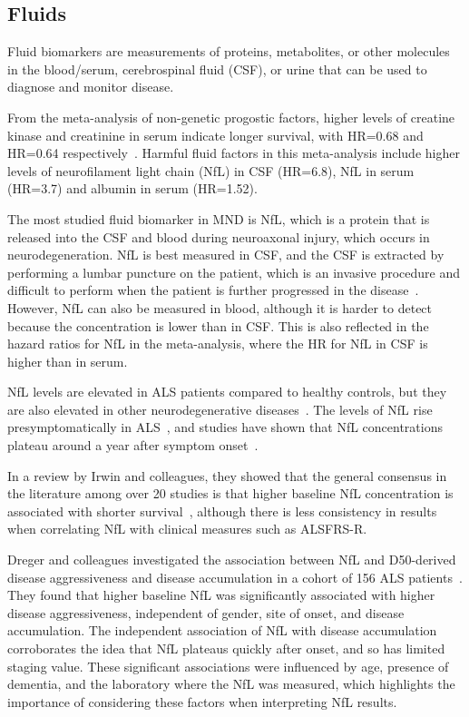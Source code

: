\subsection{Fluids}

Fluid biomarkers are measurements of proteins, metabolites, or other molecules in the blood/serum, cerebrospinal fluid (CSF), or urine that can be used to diagnose and monitor disease.

From the meta-analysis of non-genetic progostic factors, higher levels of creatine kinase and creatinine in serum indicate longer survival, with HR=0.68 and HR=0.64 respectively~\cite{suPredictorsSurvivalPatients2021}.
Harmful fluid factors in this meta-analysis  include higher levels of neurofilament light chain (NfL) in CSF (HR=6.8), NfL in serum (HR=3.7) and albumin in serum (HR=1.52).

The most studied fluid biomarker in MND is NfL, which is a protein that is released into the CSF and blood during neuroaxonal injury, which occurs in neurodegeneration.
NfL is best measured in CSF, and the CSF is extracted by performing a lumbar puncture on the patient, which is an invasive procedure and difficult to perform when the patient is further progressed in the disease~\cite{sturmeyBloodBiomarkersALS2022}.
However, NfL can also be measured in blood, although it is harder to detect because the concentration is lower than in CSF. This is also reflected in the hazard ratios for NfL in the meta-analysis, where the HR for NfL in CSF is higher than in serum.

NfL levels are elevated in ALS patients compared to healthy controls, but they are also elevated in other neurodegenerative diseases~\cite{huangLongitudinalBiomarkersAmyotrophic2020}.
The levels of NfL rise presymptomatically in ALS~\cite{benatarValidationSerumNeurofilaments2020}, and studies have shown that NfL concentrations plateau around a year after symptom onset~\cite{benatarNeurofilamentsPresymptomaticALS2019, benatarValidationSerumNeurofilaments2020, thompsonMulticentreAppraisalAmyotrophic2022}.

In a review by Irwin and colleagues, they showed that the general consensus in the literature among over 20 studies is that higher baseline NfL concentration is associated with shorter survival~\cite{irwinFluidBiomarkersAmyotrophic2024}, although there is less consistency in results when correlating NfL with clinical measures such as ALSFRS-R.

Dreger and colleagues investigated the association between NfL and D50-derived disease aggressiveness and disease accumulation in a cohort of 156 ALS patients~\cite{dregerCerebrospinalFluidNeurofilament2021}.
They found that higher baseline NfL was significantly associated with higher disease aggressiveness, independent of gender, site of onset, and disease accumulation. The independent association of NfL with disease accumulation corroborates the idea that NfL plateaus quickly after onset, and so has limited staging value.
These significant associations were influenced by age, presence of dementia, and the laboratory where the NfL was measured, which highlights the importance of considering these factors when interpreting NfL results.


